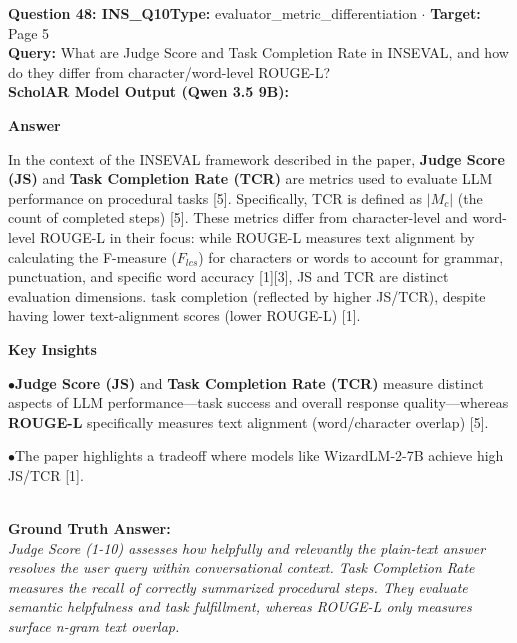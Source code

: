 \documentclass[10pt,a4paper]{article}
\begin{document}
\begin{tcolorbox}[questionbox]
{\noindent\bfseries\large\color{navy} Question 48: INS\_Q10}\hfill {\footnotesize\color{darkteal}\textbf{Type:} evaluator\_metric\_differentiation $\cdot$ \textbf{Target:} Page 5}\\[4pt]
{\noindent\bfseries\color{accentblue} Query: } What are Judge Score and Task Completion Rate in INSEVAL, and how do they differ from character/word-level ROUGE-L?\\[6pt]
{\noindent\bfseries\color{navy} ScholAR Model Output (Qwen 3.5 9B):}\\[2pt]
{\small \noindent \textbf{Answer}\par\vspace{3pt}In the context of the INSEVAL framework described in the paper, \textbf{Judge Score (JS)} and \textbf{Task Completion Rate (TCR)} are metrics used to evaluate LLM performance on procedural tasks [5]. Specifically, TCR is defined as $|M_c|$ (the count of completed steps) [5]. These metrics differ from character-level and word-level ROUGE-L in their focus: while ROUGE-L measures text alignment by calculating the F-measure ($F_{lcs}$) for characters or words to account for grammar, punctuation, and specific word accuracy [1][3], JS and TCR are distinct evaluation dimensions. task completion (reflected by higher JS/TCR), despite having lower text-alignment scores (lower ROUGE-L) [1].\par\vspace{3pt}\textbf{Key Insights}\par\vspace{3pt}\noindent\hspace*{8pt}$\bullet$\hspace*{4pt}\textbf{Judge Score (JS)} and \textbf{Task Completion Rate (TCR)} measure distinct aspects of LLM performance---task success and overall response quality---whereas \textbf{ROUGE-L} specifically measures text alignment (word/character overlap) [5].\par\vspace{3pt}\noindent\hspace*{8pt}$\bullet$\hspace*{4pt}The paper highlights a tradeoff where models like WizardLM-2-7B achieve high JS/TCR [1].}\\[6pt]
{\noindent\bfseries\color{darkteal} Ground Truth Answer:}\\[2pt]
{\small\itshape Judge Score (1-10) assesses how helpfully and relevantly the plain-text answer resolves the user query within conversational context. Task Completion Rate measures the recall of correctly summarized procedural steps. They evaluate semantic helpfulness and task fulfillment, whereas ROUGE-L only measures surface n-gram text overlap.}\\[4pt]

\end{tcolorbox}
\end{document}
